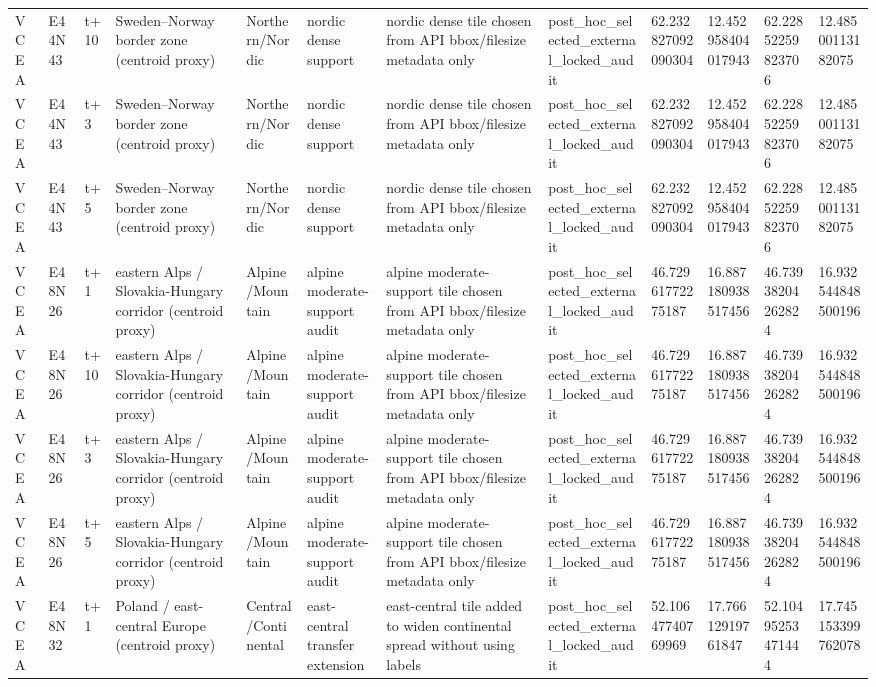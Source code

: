 \begin{landscape}
\begin{longtable}{llllllllllll}
VCEA & E44N43 & t+10 & Sweden–Norway border zone (centroid proxy) & Northern/Nordic & nordic dense support & nordic dense tile chosen from API bbox/filesize metadata only & post\_hoc\_selected\_external\_locked\_audit & 62.232827092090304 & 12.452958404017943 & 62.22852259823706 & 12.48500113182075 \\
VCEA & E44N43 & t+3 & Sweden–Norway border zone (centroid proxy) & Northern/Nordic & nordic dense support & nordic dense tile chosen from API bbox/filesize metadata only & post\_hoc\_selected\_external\_locked\_audit & 62.232827092090304 & 12.452958404017943 & 62.22852259823706 & 12.48500113182075 \\
VCEA & E44N43 & t+5 & Sweden–Norway border zone (centroid proxy) & Northern/Nordic & nordic dense support & nordic dense tile chosen from API bbox/filesize metadata only & post\_hoc\_selected\_external\_locked\_audit & 62.232827092090304 & 12.452958404017943 & 62.22852259823706 & 12.48500113182075 \\
VCEA & E48N26 & t+1 & eastern Alps / Slovakia-Hungary corridor (centroid proxy) & Alpine/Mountain & alpine moderate-support audit & alpine moderate-support tile chosen from API bbox/filesize metadata only & post\_hoc\_selected\_external\_locked\_audit & 46.72961772275187 & 16.887180938517456 & 46.73938204262824 & 16.932544848500196 \\
VCEA & E48N26 & t+10 & eastern Alps / Slovakia-Hungary corridor (centroid proxy) & Alpine/Mountain & alpine moderate-support audit & alpine moderate-support tile chosen from API bbox/filesize metadata only & post\_hoc\_selected\_external\_locked\_audit & 46.72961772275187 & 16.887180938517456 & 46.73938204262824 & 16.932544848500196 \\
VCEA & E48N26 & t+3 & eastern Alps / Slovakia-Hungary corridor (centroid proxy) & Alpine/Mountain & alpine moderate-support audit & alpine moderate-support tile chosen from API bbox/filesize metadata only & post\_hoc\_selected\_external\_locked\_audit & 46.72961772275187 & 16.887180938517456 & 46.73938204262824 & 16.932544848500196 \\
VCEA & E48N26 & t+5 & eastern Alps / Slovakia-Hungary corridor (centroid proxy) & Alpine/Mountain & alpine moderate-support audit & alpine moderate-support tile chosen from API bbox/filesize metadata only & post\_hoc\_selected\_external\_locked\_audit & 46.72961772275187 & 16.887180938517456 & 46.73938204262824 & 16.932544848500196 \\
VCEA & E48N32 & t+1 & Poland / east-central Europe (centroid proxy) & Central/Continental & east-central transfer extension & east-central tile added to widen continental spread without using labels & post\_hoc\_selected\_external\_locked\_audit & 52.10647740769969 & 17.76612919761847 & 52.10495253471444 & 17.745153399762078 \\

\end{longtable}
\end{landscape}
